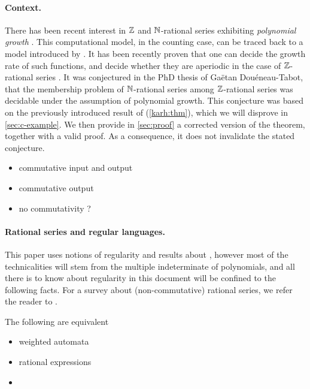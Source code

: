 \documentclass[a4paper,11pt]{article}
\begin{document}
\paragraph*{Context.} There has been recent interest in $\mathbb{Z}$ and
$\mathbb{N}$-rational series exhibiting \emph{polynomial growth}
\cite{doueneau2021pebble,bojanczyk2022transducers}. This computational model,
in the counting case, can be traced back to a model introduced by
\textcite{schutzenberger1965finite}. It has been recently proven that one can
decide the growth rate of such functions, and decide whether they are aperiodic
in the case of $\mathbb{Z}$-rational series \cite{LOPEZ23b}. It was conjectured in
the PhD thesis of Gaëtan Douéneau-Tabot, that the membership problem of
$\mathbb{N}$-rational series among $\mathbb{Z}$-rational series was decidable under the
assumption of polynomial growth. This conjecture was based on the previously
introduced result of \textcite{KARH77} (\cref{karh:thm}), which we will
disprove in \cref{sec:c-example}. We then provide in \cref{sec:proof} a
corrected version of the theorem, together with a valid proof. As a
consequence, it does not invalidate the stated conjecture.

\begin{itemize}
    \item commutative input and output
    \item commutative output
    \item no commutativity ?
\end{itemize}

\AP \paragraph*{Rational series and regular languages.} This paper uses notions
of regularity and results about , however most of
the technicalities will stem from the multiple indeterminate of polynomials,
and all there is to know about regularity in this document will be confined to
the following facts. For a survey about (non-commutative) rational series, we
refer the reader to \cite{berstel2011noncommutative}. 

\begin{definition}
    The following are equivalent
    \begin{itemize}
        \item weighted automata
        \item rational expressions
        \item 
    \end{itemize}
\end{definition}
\end{document}
